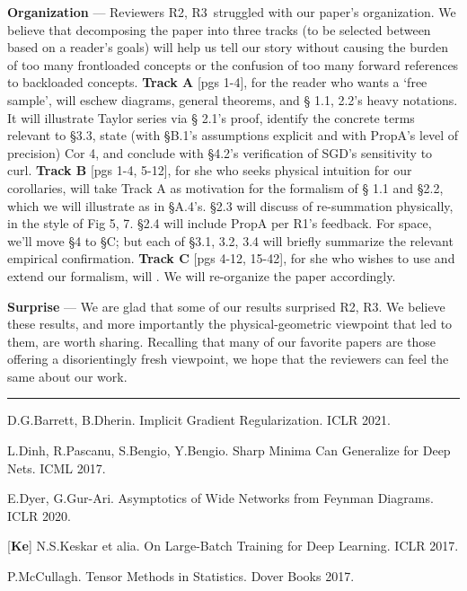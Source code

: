 \documentclass{article}
\newcommand{\Ra}{\textmd{\textsf{\color{purple!50} {R1}}}}
\newcommand{\Rb}{\textmd{\textsf{\color{green!50}  {R2}}}}
\newcommand{\Rc}{\textmd{\textsf{\color{blue!50}   {R3}}}}
\newcommand{\cor}[1]{\textmd{\textsf{Cor #1}}}
\newcommand{\fig}[1]{\textmd{\textsf{Fig #1}}}
\newcommand{\prp}[1]{\textmd{\textsf{Prop#1}}}
\newcommand{\cit}[1]{[\textbf{#1}]}
\newcommand{\moosect}[1]{\par\noindent\textbf{#1} ---}
\begin{document}
\moosect{Organization}
    Reviewers \Rb,\Rc\ struggled with our paper's organization.  We believe 
    that decomposing the paper into three tracks (to be selected between based
    on a reader's goals) will help us tell our story without causing the burden
    of too many frontloaded concepts or the confusion of too many
    forward references to backloaded concepts.
    \textbf{Track A} [pgs 1-4], for the reader who wants a `free sample', will
    eschew diagrams, general theorems, and \S
    1.1, 2.2's heavy notations.  It will illustrate Taylor series via \S
    2.1's proof, identify the concrete terms relevant to \S 3.3, state
    (with \S B.1's assumptions explicit and with \prp{A}'s level of precision)
    \cor{4}, and conclude with \S 4.2's verification of SGD's sensitivity to
    curl.  
    \textbf{Track B} [pgs 1-4, 5-12], for she who seeks physical intuition for
    our corollaries, will take Track A as motivation for the formalism of \S
    1.1 and \S 2.2, which we will illustrate as in \S A.4's.  \S 2.3 will 
    discuss of re-summation physically, in the style of \fig{5, 7}.
    \S 2.4 will include \prp{A} per \Ra's feedback.  For space, we'll
    move \S 4 to \S C; but each of \S 3.1, 3.2, 3.4 will briefly summarize the
    relevant empirical confirmation.
    \textbf{Track C} [pgs 4-12, 15-42], for she who wishes to use and extend
    our formalism, will .
    We will re-organize the paper accordingly.

\moosect{Surprise}
    We are glad that some of our results surprised \Rb, \Rc.  We believe these
    results, and more importantly the physical-geometric viewpoint that led to
    them, are worth sharing.  Recalling that many of our favorite papers
    are those offering a disorientingly fresh viewpoint, we hope that the
    reviewers can feel the same about our work.

\par\noindent
\vspace{0.1cm}
\hrule

    \noindent
    \cit{Ba} D.G.Barrett, B.Dherin.  Implicit Gradient Regularization.  ICLR 2021.

    \noindent
    \cit{Di} L.Dinh, R.Pascanu, S.Bengio, Y.Bengio.  Sharp Minima Can Generalize for Deep Nets.  ICML 2017.

    \noindent
    \cit{Dy} E.Dyer, G.Gur-Ari.  Asymptotics of Wide Networks from Feynman Diagrams.  ICLR 2020.

    \noindent
    \cit{Ke} N.S.Keskar et alia.  On Large-Batch Training for Deep Learning.  ICLR 2017.

    \noindent
    \cit{Mc} P.McCullagh.  Tensor Methods in Statistics.  Dover Books 2017.

\end{document}
